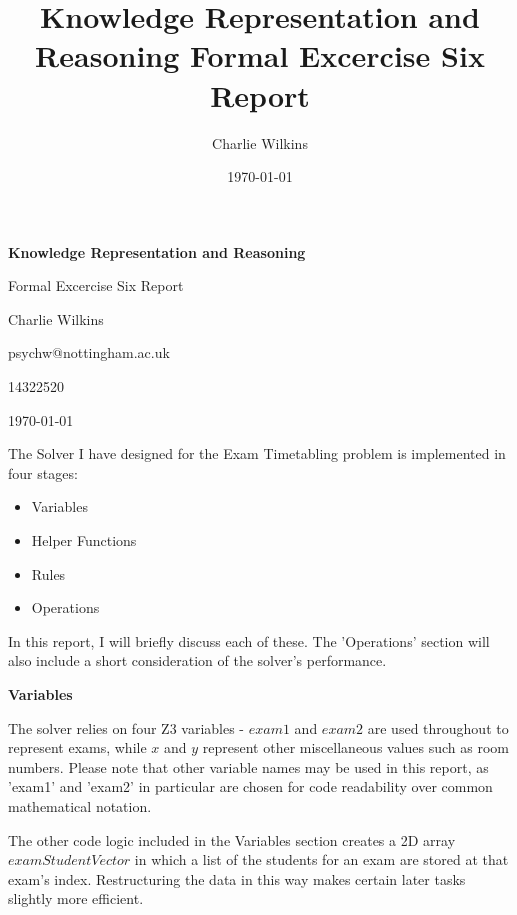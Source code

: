 \documentclass[11pt]{article}
\title{Knowledge Representation and Reasoning Formal Excercise Six Report}
\author{Charlie Wilkins}
\date{\today}
\begin{document}
	\begin{titlepage}
		\begin{center}
			\vspace*{1cm}

       		\textbf{Knowledge Representation and Reasoning}

       		\vspace{0.5cm}
			   Formal Excercise Six Report

       		\vspace{1.5cm}

       		Charlie Wilkins
			
			\vspace{0.5cm}			
			
       		psychw@nottingham.ac.uk
       		
       		14322520
       		
       		\vspace{0.5cm}
       		
       		\today
		\end{center}
	\end{titlepage}


	The Solver I have designed for the Exam Timetabling problem is implemented in four stages:
	
	\begin{itemize}
		\item Variables
		\item Helper Functions
		\item Rules
		\item Operations
	\end{itemize}

	In this report, I will briefly discuss each of these. The 'Operations' section will also include a short consideration of the solver's performance.\newline

	\textbf{Variables}

	The solver relies on four Z3 variables - \(exam1\) and \(exam2\) are used throughout to represent exams, while \(x\) and \(y\) represent other miscellaneous values such as room numbers. Please note that other variable names may be used in this report, as 'exam1' and 'exam2' in particular are chosen for code readability over common mathematical notation.

	The other code logic included in the Variables section creates a 2D array \(examStudentVector\) in which a list of the students for an exam are stored at that exam's index. Restructuring the data in this way makes certain later tasks slightly more efficient.\newline
\end{document}
